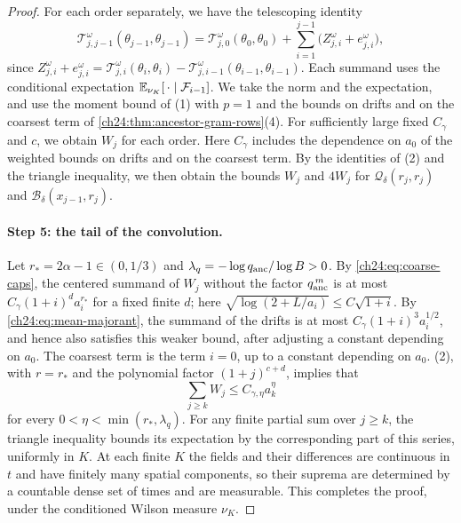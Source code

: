 \begin{proof}
For each order separately, we have the telescoping identity
\begin{equation}\label{ch24:eq:ordered-telescope}
 \mathscr T_{j,j-1}^\omega(\theta_{j-1},\theta_{j-1})=\mathscr T_{j,0}^\omega(\theta_0,\theta_0)+\sum_{i=1}^{j-1}\bigl(Z_{j,i}^\omega+e_{j,i}^\omega\bigr),
\end{equation}
since $Z_{j,i}^\omega+e_{j,i}^\omega=\mathscr T_{j,i}^\omega(\theta_i,\theta_i)-\mathscr T_{j,i-1}^\omega(\theta_{i-1},\theta_{i-1})$. Each summand uses the conditional expectation $\mathbb E_{\nu_K}[\,\cdot\mid\mathcal F_{i-1}]$. We take the norm and the expectation, and use the moment bound of (1) with $p=1$ and the bounds on drifts and on the coarsest term of \cref{ch24:thm:ancestor-gram-rows}(4). For sufficiently large fixed $C_\gamma$ and $c$, we obtain $W_j$ for each order. Here $C_\gamma$ includes the dependence on $a_0$ of the weighted bounds on drifts and on the coarsest term. By the identities of (2) and the triangle inequality, we then obtain the bounds $W_j$ and $4W_j$ for $\mathcal Q_\delta(r_j,r_j)$ and $\mathcal B_\delta(x_{j-1},r_j)$.

\paragraph{Step 5: the tail of the convolution.}
Let $r_*=2\alpha-1\in(0,1/3)$ and $\lambda_q=-\log q_{\mathrm{anc}}/\log B>0$. By \eqref{ch24:eq:coarse-caps}, the centered summand of $W_j$ without the factor $q_{\mathrm{anc}}^{\,m}$ is at most $C_\gamma(1+i)^da_i^{r_*}$ for a fixed finite $d$; here $\sqrt{\log(2+L/a_i)}\le C\sqrt{1+i}$. By \eqref{ch24:eq:mean-majorant}, the summand of the drifts is at most $C_\gamma(1+i)^3a_i^{1/2}$, and hence also satisfies this weaker bound, after adjusting a constant depending on $a_0$. The coarsest term is the term $i=0$, up to a constant depending on $a_0$. (2), with $r=r_*$ and the polynomial factor $(1+j)^{c+d}$, implies that
\[
 \sum_{j\ge k}W_j\le C_{\gamma,\eta}a_k^\eta
\]
for every $0<\eta<\min(r_*,\lambda_q)$. For any finite partial sum over $j\ge k$, the triangle inequality bounds its expectation by the corresponding part of this series, uniformly in $K$. At each finite $K$ the fields and their differences are continuous in $t$ and have finitely many spatial components, so their suprema are determined by a countable dense set of times and are measurable. This completes the proof, under the conditioned Wilson measure $\nu_K$.
\end{proof}

